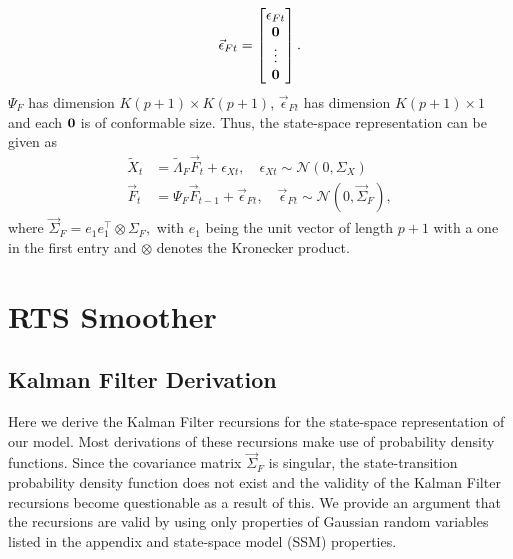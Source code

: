 $$\vec{\epsilon}_{Ft} =
\begin{bmatrix}
		\epsilon_{Ft} \\ \bf 0 \\ \vdots \\ \bf 0
	\end{bmatrix}.$$
$\Psi_{F}$ has dimension $K (p + 1) \times K (p + 1)$, $\vec{\epsilon}_{Ft}$ has dimension $K (p + 1) \times 1$ and each $\bf 0$ is of conformable size. Thus, the state-space representation can be given as 
\begin{align} 
	\tilde{X}_{t} &= \tilde{\Lambda}_F \vec{F}_{t} + \epsilon_{Xt}, \quad \epsilon_{Xt} \sim \mathcal N \left( 0, \Sigma_X \right) \label{SSR-obs} \\
	\vec{F}_{t} &= \Psi_{F} \vec{F}_{t-1} + \vec{\epsilon}_{Ft}, \quad \vec{\epsilon}_{Ft} \sim \mathcal N \left( 0, \vec{\Sigma}_F \right) \label{SSR-state},
\end{align}
where $\vec{\Sigma}_F = e_1 e_1^{\top} \otimes \Sigma_F,$ with $e_1$ being the unit vector of length $p + 1$ with a one in the first entry and $\otimes$ denotes the Kronecker product.

\section{RTS Smoother}
\subsection{Kalman Filter Derivation}	
Here we derive the Kalman Filter recursions for the state-space representation of our model. Most derivations of these recursions make use of probability density functions. Since the covariance matrix $\vec{\Sigma}_F$ is singular, the state-transition probability density function does not exist and the validity of the Kalman Filter recursions become questionable as a result of this. We provide an argument that the recursions are valid by using only properties of Gaussian random variables listed in the appendix and state-space model (SSM) properties. 


